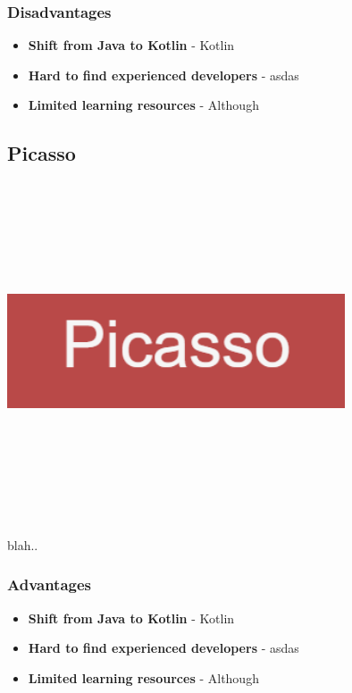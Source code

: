 \subsubsection{Disadvantages}
\begin{itemize}
    \item \textbf{Shift from Java to Kotlin} - Kotlin
    \item \textbf{Hard to find experienced developers} - asdas
    \item \textbf{Limited learning resources} - Although
\end{itemize}
\subsection{Picasso}
\par
\medskip
\begin{center}
    \includegraphics[width=10cm,height=10cm,keepaspectratio]{Images/picasso.png}
\end{center}

blah..


\subsubsection{Advantages}
\begin{itemize}
    \item \textbf{Shift from Java to Kotlin} - Kotlin
    \item \textbf{Hard to find experienced developers} - asdas
    \item \textbf{Limited learning resources} - Although
\end{itemize}
